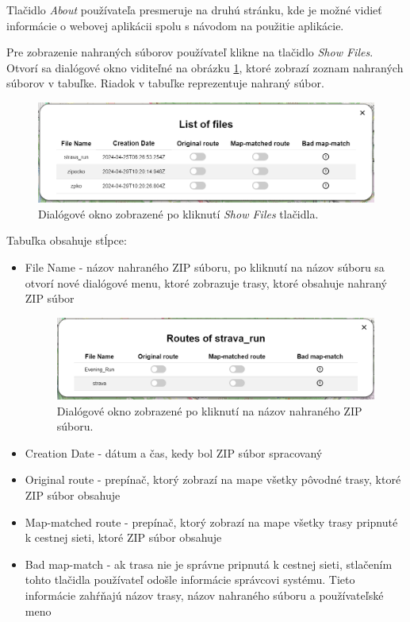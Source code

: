 Tlačidlo \textit{About} používateľa presmeruje na druhú stránku, kde je možné vidieť informácie o webovej aplikácii spolu s návodom na použitie aplikácie.

Pre zobrazenie nahraných súborov používateľ klikne na tlačidlo \textit{Show Files}. Otvorí sa dialógové okno viditeľné na obrázku \ref{fig:uploaded_routes_dialog}, ktoré zobrazí zoznam nahraných súborov v tabuľke. Riadok v tabuľke reprezentuje nahraný súbor.
\begin{figure}[H]
  \centering
  \includegraphics[width=0.8 \textwidth]{img/tools-panel/uploaded-routes.png}
  \caption{Dialógové okno zobrazené po kliknutí \textit{Show Files} tlačidla.}
  \label{fig:uploaded_routes_dialog}
\end{figure}
\noindent Tabuľka obsahuje stĺpce:
\begin{itemize}
  \item File Name - názov nahraného ZIP súboru, po kliknutí na názov súboru sa otvorí nové dialógové menu, ktoré zobrazuje trasy, ktoré obsahuje nahraný ZIP súbor
        \begin{figure}[H]
          \centering
          \includegraphics[width=0.8 \textwidth]{img/tools-panel/routes-of-zip.png}
          \caption{Dialógové okno zobrazené po kliknutí na názov nahraného ZIP súboru.}
        \end{figure}
  \item Creation Date - dátum a čas, kedy bol ZIP súbor spracovaný
  \item Original route - prepínač, ktorý zobrazí na mape všetky pôvodné trasy, ktoré ZIP súbor obsahuje
  \item Map-matched route - prepínač, ktorý zobrazí na mape všetky trasy pripnuté k cestnej sieti, ktoré ZIP súbor obsahuje
  \item Bad map-match - ak trasa nie je správne pripnutá k cestnej sieti, stlačením tohto tlačidla používateľ odošle informácie správcovi systému. Tieto informácie zahŕňajú názov trasy, názov nahraného súboru a používateľské meno
\end{itemize}

